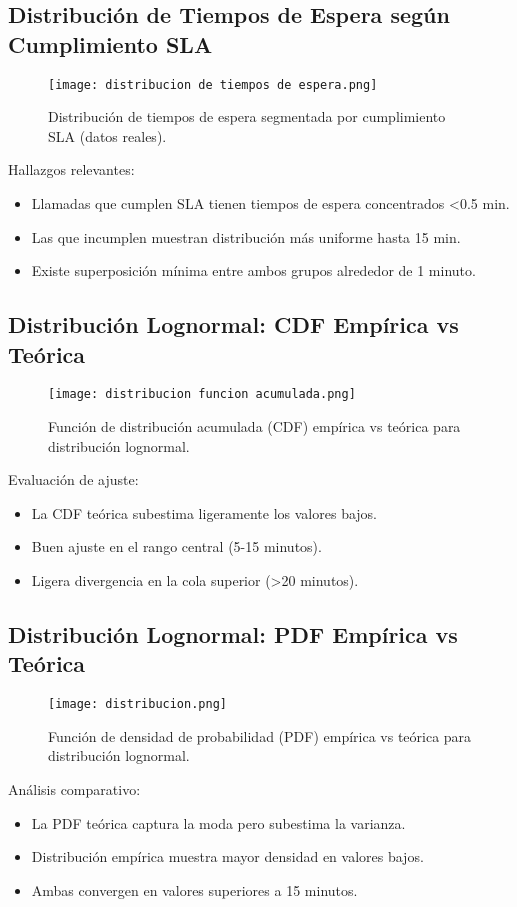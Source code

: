 \documentclass[12pt]{article}
\begin{document}
\subsection{Distribución de Tiempos de Espera según Cumplimiento SLA}
\begin{figure}[H]
  \centering
  \texttt{[image: distribucion de tiempos de espera.png]}
  \caption{Distribución de tiempos de espera segmentada por cumplimiento SLA (datos reales).}
\end{figure}
\noindent
Hallazgos relevantes:
\begin{itemize}
  \item Llamadas que cumplen SLA tienen tiempos de espera concentrados <0.5 min.
  \item Las que incumplen muestran distribución más uniforme hasta 15 min.
  \item Existe superposición mínima entre ambos grupos alrededor de 1 minuto.
\end{itemize}

\subsection{Distribución Lognormal: CDF Empírica vs Teórica}
\begin{figure}[H]
  \centering
  \texttt{[image: distribucion funcion acumulada.png]}
  \caption{Función de distribución acumulada (CDF) empírica vs teórica para distribución lognormal.}
\end{figure}
\noindent
Evaluación de ajuste:
\begin{itemize}
  \item La CDF teórica subestima ligeramente los valores bajos.
  \item Buen ajuste en el rango central (5-15 minutos).
  \item Ligera divergencia en la cola superior (>20 minutos).
\end{itemize}

\subsection{Distribución Lognormal: PDF Empírica vs Teórica}
\begin{figure}[H]
  \centering
  \texttt{[image: distribucion.png]}
  \caption{Función de densidad de probabilidad (PDF) empírica vs teórica para distribución lognormal.}
\end{figure}
\noindent
Análisis comparativo:
\begin{itemize}
  \item La PDF teórica captura la moda pero subestima la varianza.
  \item Distribución empírica muestra mayor densidad en valores bajos.
  \item Ambas convergen en valores superiores a 15 minutos.
\end{itemize}
\end{document}
